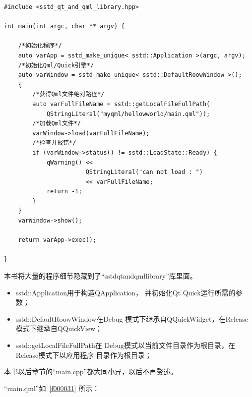 \FloatBarrier
\begin{lstlisting}[label=f000030,
caption=GoodLuck,
title=\lstlistingname\ \thelstlisting\marginnote{\fbox{\footnotesize{\lstlistingname\ \thelstlisting}}}
]
#include <sstd_qt_and_qml_library.hpp>

int main(int argc, char ** argv) {

    /*初始化程序*/
    auto varApp = sstd_make_unique< sstd::Application >(argc, argv);
    /*初始化Qml/Quick引擎*/
    auto varWindow = sstd_make_unique< sstd::DefaultRoowWindow >();
    {
        /*获得Qml文件绝对路径*/
        auto varFullFileName = sstd::getLocalFileFullPath(
            QStringLiteral("myqml/hellowworld/main.qml"));
        /*加载Qml文件*/
        varWindow->load(varFullFileName);
        /*检查并报错*/
        if (varWindow->status() != sstd::LoadState::Ready) {
            qWarning() <<
                       QStringLiteral("can not load : ")
                       << varFullFileName;
            return -1;
        }
    }
    varWindow->show();

    return varApp->exec();

}
\end{lstlisting}          %

本书将大量的程序细节隐藏到了“sstd\underline{\hspace{0.5em}}qt\underline{\hspace{0.5em}}and\underline{\hspace{0.5em}}qml\underline{\hspace{0.5em}}library”库里面。

\begin{itemize}
\item sstd::Application用于构造QApplication，
并初始化Qt Quick运行所需的参数；
\item sstd::DefaultRoowWindow在Debug
模式下继承自QQuickWidget，在Release模式下继承自QQuickView；
\item sstd::getLocalFileFullPath在
Debug模式以当前文件目录作为根目录，在Release模式下以应用程序
目录作为根目录；
\end{itemize}

本书以后章节的“main.cpp”都大同小异，以后不再赘述。


“main.qml”如\lstlistingname\ \ref{f000031}
所示：


